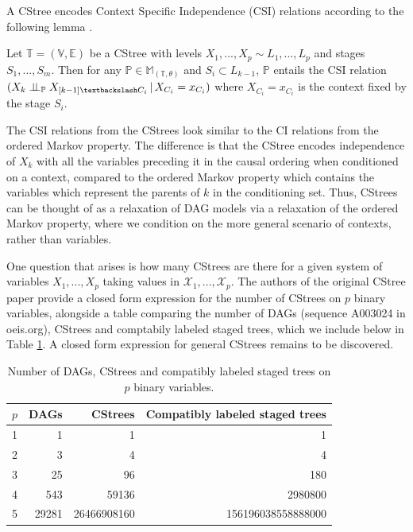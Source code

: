 \documentclass{tufte-book}
\begin{document}
A CStree encodes Context Specific Independence (CSI) relations according to the following lemma \cite{duarte-2021-repres-contex}.


\begin{lemma}\label{lem:cstreecsi}

Let $\mathbb{T} = (\mathbb{V},\mathbb{E})$ be a CStree with levels $X_1,...,X_p \sim L_1,...,L_p$ and stages $S_1,...,S_m$. Then for any $\mathbb{P} \in \mathbb{M}_{(\mathbb{T},\theta)}$ and $S_i \subset L_{k-1}$, $\mathbb{P}$ entails the CSI relation $(X_k \indep_{\mathbb{P}} X_{[k-1] \textbackslash C_i} \, | \, X_{C_i} = x_{C_i})$ where $X_{C_i}=x_{C_i}$ is the context fixed by the stage $S_i$.

\end{lemma}

The CSI relations from the CStrees look similar to the CI relations from the ordered Markov property. The difference is that the CStree encodes independence of \(X_k\) with all the variables preceding it in the causal ordering when conditioned on a context, compared to the ordered Markov property which contains the variables which represent the parents of \(k\) in the conditioning set. Thus, CStrees can be thought of as a relaxation of DAG models via a relaxation of the ordered Markov property, where we condition on the more general scenario of contexts, rather than variables. 


One question that arises is how many CStrees are there for a given system of variables \(X_1,...,X_p\) taking values in \(\mathcal{X}_1,...,\mathcal{X}_p\). The authors of the original CStree paper \cite{duarte-2021-repres-contex} provide a closed form expression for the number of CStrees on \(p\) binary variables, alongside a table comparing the number of DAGs (sequence A003024 in oeis.org), CStrees and comptabily labeled staged trees, which we include below in Table \ref{tab:orgf28dcc2}. A closed form expression for general CStrees remains to be discovered.

\begin{table}[htbp]
\caption{\label{tab:orgf28dcc2}Number of DAGs, CStrees and compatibly labeled staged trees on \(p\) binary variables.}
\centering
\begin{tabular}{rrrr}
\(p\) & DAGs & CStrees & Compatibly labeled staged trees\\
\hline
1 & 1 & 1 & 1\\
2 & 3 & 4 & 4\\
3 & 25 & 96 & 180\\
4 & 543 & 59136 & 2980800\\
5 & 29281 & 26466908160 & 156196038558888000\\
\end{tabular}
\end{table}
\end{document}
